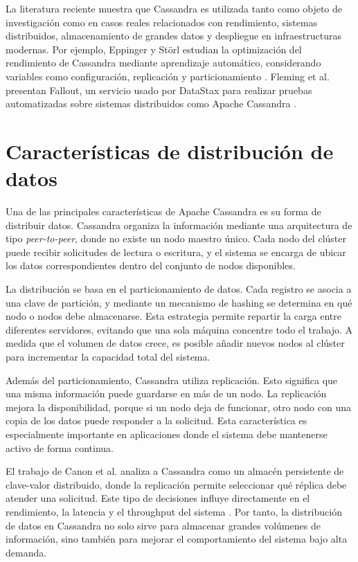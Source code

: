 \documentclass[12pt,a4paper]{article}
\begin{document}
La literatura reciente muestra que Cassandra es utilizada tanto como objeto de investigación como en casos reales relacionados con rendimiento, sistemas distribuidos, almacenamiento de grandes datos y despliegue en infraestructuras modernas. Por ejemplo, Eppinger y Störl estudian la optimización del rendimiento de Cassandra mediante aprendizaje automático, considerando variables como configuración, replicación y particionamiento \cite{eppinger2023}. Fleming et al. presentan Fallout, un servicio usado por DataStax para realizar pruebas automatizadas sobre sistemas distribuidos como Apache Cassandra \cite{fleming2021}.

\section{Características de distribución de datos}

Una de las principales características de Apache Cassandra es su forma de distribuir datos. Cassandra organiza la información mediante una arquitectura de tipo \textit{peer-to-peer}, donde no existe un nodo maestro único. Cada nodo del clúster puede recibir solicitudes de lectura o escritura, y el sistema se encarga de ubicar los datos correspondientes dentro del conjunto de nodos disponibles.

La distribución se basa en el particionamiento de datos. Cada registro se asocia a una clave de partición, y mediante un mecanismo de hashing se determina en qué nodo o nodos debe almacenarse. Esta estrategia permite repartir la carga entre diferentes servidores, evitando que una sola máquina concentre todo el trabajo. A medida que el volumen de datos crece, es posible añadir nuevos nodos al clúster para incrementar la capacidad total del sistema.

Además del particionamiento, Cassandra utiliza replicación. Esto significa que una misma información puede guardarse en más de un nodo. La replicación mejora la disponibilidad, porque si un nodo deja de funcionar, otro nodo con una copia de los datos puede responder a la solicitud. Esta característica es especialmente importante en aplicaciones donde el sistema debe mantenerse activo de forma continua.

El trabajo de Canon et al. analiza a Cassandra como un almacén persistente de clave-valor distribuido, donde la replicación permite seleccionar qué réplica debe atender una solicitud. Este tipo de decisiones influye directamente en el rendimiento, la latencia y el throughput del sistema \cite{canon2023}. Por tanto, la distribución de datos en Cassandra no solo sirve para almacenar grandes volúmenes de información, sino también para mejorar el comportamiento del sistema bajo alta demanda.
\end{document}
